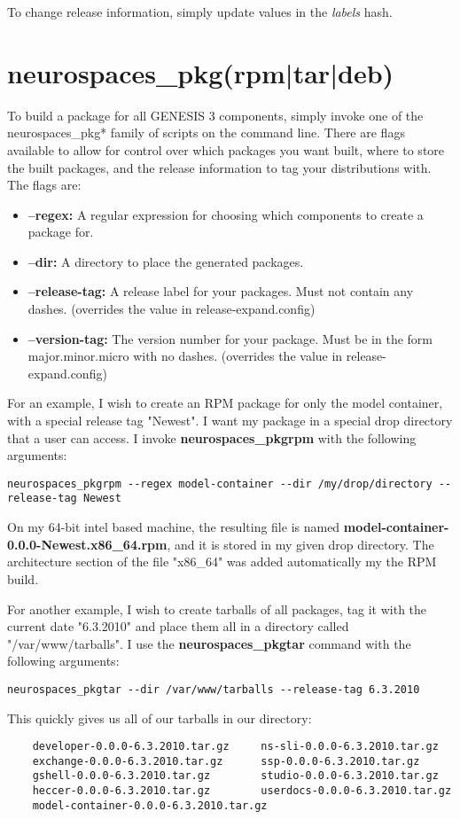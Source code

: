 \documentclass[12pt]{article}
\begin{document}
To change release information, simply update values in the {\it
  labels} hash.

\section*{neurospaces\_pkg(rpm|tar|deb)}

To build a package for all GENESIS 3 components, simply invoke one of the neurospaces\_pkg* family of scripts on the command line. There are flags available to allow for control over which packages you want built, where to store the built packages, and the release information to tag your distributions with. The flags are:

\begin{itemize}
\item[] {\bf --regex:} A regular expression for choosing which components to create a package for. 
\item[] {\bf --dir:} A directory to place the generated packages.
\item[] {\bf --release-tag:} A release label for your packages. Must not contain any dashes. (overrides the value in release-expand.config)
\item[] {\bf --version-tag:} The version number for your package. Must be in the form major.minor.micro with no dashes. (overrides the value in release-expand.config)
\end{itemize}

For an example, I wish to create an RPM package for only the model container, with a special release tag "Newest". I want my package in a special drop directory that a user can access. I invoke {\bf neurospaces\_pkgrpm} with the following arguments:

\begin{verbatim}
neurospaces_pkgrpm --regex model-container --dir /my/drop/directory --release-tag Newest 
\end{verbatim}

On my 64-bit intel based machine, the resulting file is named {\bf model-container-0.0.0-Newest.x86\_64.rpm}, and it is stored in my given drop directory. The architecture section of the file "x86\_64" was added automatically my the RPM build.

For another example, I wish to create tarballs of all packages, tag it with the current date "6.3.2010" and place them all in a directory called "/var/www/tarballs".  I use the {\bf neurospaces\_pkgtar} command with the following arguments:

\begin{verbatim}
neurospaces_pkgtar --dir /var/www/tarballs --release-tag 6.3.2010
\end{verbatim}

This quickly gives us all of our tarballs in our directory:

\begin{verbatim}
	developer-0.0.0-6.3.2010.tar.gz		ns-sli-0.0.0-6.3.2010.tar.gz
	exchange-0.0.0-6.3.2010.tar.gz		ssp-0.0.0-6.3.2010.tar.gz
	gshell-0.0.0-6.3.2010.tar.gz		studio-0.0.0-6.3.2010.tar.gz
	heccer-0.0.0-6.3.2010.tar.gz		userdocs-0.0.0-6.3.2010.tar.gz
	model-container-0.0.0-6.3.2010.tar.gz
\end{verbatim}
\end{document}
